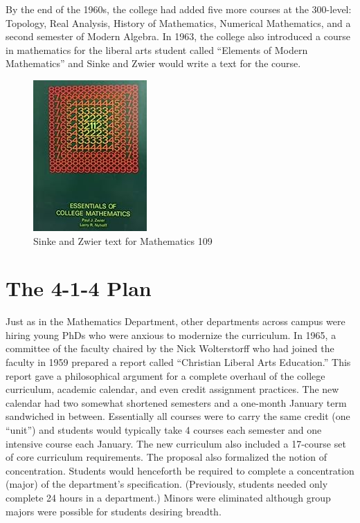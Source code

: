 \documentclass[
]{book}
\begin{document}
By the end of the 1960s, the college had added five more courses at the 300-level: Topology, Real Analysis, History of Mathematics, Numerical Mathematics, and a second semester of Modern Algebra. In 1963, the college also introduced a course in mathematics for the liberal arts student called ``Elements of Modern Mathematics'' and Sinke and Zwier would write a text for the course.

\begin{figure}

{\centering \includegraphics[width=0.5\linewidth]{images/ZwierSinke109} 

}

\caption{Sinke and Zwier text for Mathematics 109}\label{fig:zwiersink}
\end{figure}

\hypertarget{the-4-1-4-plan}{%
\section{The 4-1-4 Plan}\label{the-4-1-4-plan}}

Just as in the Mathematics Department, other departments across campus were hiring young PhDs who were anxious to modernize the curriculum. In 1965, a committee of the faculty chaired by the Nick Wolterstorff who had joined the faculty in 1959 prepared a report called ``Christian Liberal Arts Education.'' This report gave a philosophical argument for a complete overhaul of the college curriculum, academic calendar, and even credit assignment practices. The new calendar had two somewhat shortened semesters and a one-month January term sandwiched in between. Essentially all courses were to carry the same credit (one ``unit'') and students would typically take 4 courses each semester and one intensive course each January. The new curriculum also included a 17-course set of core curriculum requirements. The proposal also formalized the notion of concentration. Students would henceforth be required to complete a concentration (major) of the department's specification. (Previously, students needed only complete 24 hours in a department.) Minors were eliminated although group majors were possible for students desiring breadth.
\end{document}
